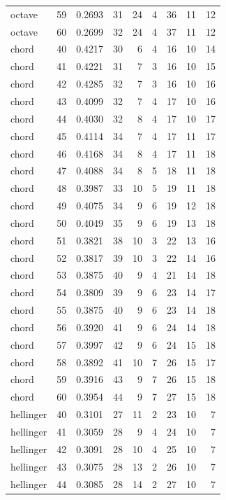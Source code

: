 {\begin{longtable}{lrrrrrrrr}
  octave & 59 & 0.2693 & 31 & 24 & 4 & 36 & 11 & 12 \\
  octave & 60 & 0.2699 & 32 & 24 & 4 & 37 & 11 & 12 \\
  chord & 40 & 0.4217 & 30 & 6 & 4 & 16 & 10 & 14 \\
  chord & 41 & 0.4221 & 31 & 7 & 3 & 16 & 10 & 15 \\
  chord & 42 & 0.4285 & 32 & 7 & 3 & 16 & 10 & 16 \\
  chord & 43 & 0.4099 & 32 & 7 & 4 & 17 & 10 & 16 \\
  chord & 44 & 0.4030 & 32 & 8 & 4 & 17 & 10 & 17 \\
  chord & 45 & 0.4114 & 34 & 7 & 4 & 17 & 11 & 17 \\
  chord & 46 & 0.4168 & 34 & 8 & 4 & 17 & 11 & 18 \\
  chord & 47 & 0.4088 & 34 & 8 & 5 & 18 & 11 & 18 \\
  chord & 48 & 0.3987 & 33 & 10 & 5 & 19 & 11 & 18 \\
  chord & 49 & 0.4075 & 34 & 9 & 6 & 19 & 12 & 18 \\
  chord & 50 & 0.4049 & 35 & 9 & 6 & 19 & 13 & 18 \\
  chord & 51 & 0.3821 & 38 & 10 & 3 & 22 & 13 & 16 \\
  chord & 52 & 0.3817 & 39 & 10 & 3 & 22 & 14 & 16 \\
  chord & 53 & 0.3875 & 40 & 9 & 4 & 21 & 14 & 18 \\
  chord & 54 & 0.3809 & 39 & 9 & 6 & 23 & 14 & 17 \\
  chord & 55 & 0.3875 & 40 & 9 & 6 & 23 & 14 & 18 \\
  chord & 56 & 0.3920 & 41 & 9 & 6 & 24 & 14 & 18 \\
  chord & 57 & 0.3997 & 42 & 9 & 6 & 24 & 15 & 18 \\
  chord & 58 & 0.3892 & 41 & 10 & 7 & 26 & 15 & 17 \\
  chord & 59 & 0.3916 & 43 & 9 & 7 & 26 & 15 & 18 \\
  chord & 60 & 0.3954 & 44 & 9 & 7 & 27 & 15 & 18 \\
  hellinger & 40 & 0.3101 & 27 & 11 & 2 & 23 & 10 & 7 \\
  hellinger & 41 & 0.3059 & 28 & 9 & 4 & 24 & 10 & 7 \\
  hellinger & 42 & 0.3091 & 28 & 10 & 4 & 25 & 10 & 7 \\
  hellinger & 43 & 0.3075 & 28 & 13 & 2 & 26 & 10 & 7 \\
  hellinger & 44 & 0.3085 & 28 & 14 & 2 & 27 & 10 & 7 \\

\end{longtable}}
